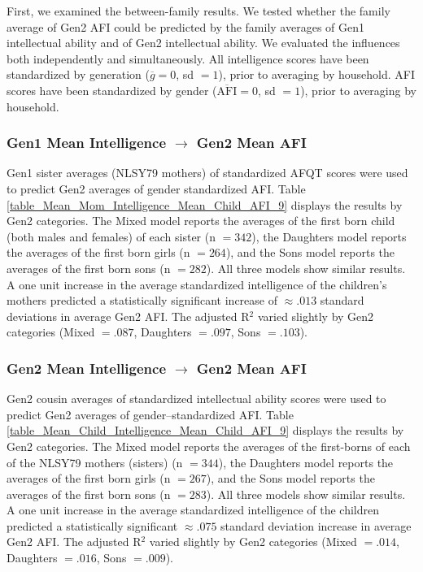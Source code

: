 First, we examined the between-family results. We tested whether the family average of Gen2 AFI could be predicted by the family averages of Gen1 intellectual ability and of Gen2 intellectual ability. We evaluated the influences both independently and simultaneously. All intelligence scores have been standardized by generation ($\overline{g} = 0$, sd $= 1$), prior to averaging by household. AFI scores have been standardized by gender ($\overline{\mathrm{AFI}} = 0$, sd $= 1$), prior to averaging by household.

\subsubsection{Gen1 Mean Intelligence $\rightarrow$ Gen2 Mean AFI} Gen1 sister averages (NLSY79 mothers) of standardized AFQT scores were used to predict Gen2 averages of gender standardized AFI. Table \ref{table_Mean_Mom_Intelligence_Mean_Child_AFI_9} displays the results by Gen2 categories. The Mixed model reports the averages of the first born child (both males and females) of each sister (n $= 342$), the Daughters model reports the averages of the first born girls (n $= 264$), and the Sons model reports the averages of the first born sons (n $= 282$). All three models show similar results. A one unit increase in the average standardized intelligence of the children's mothers predicted a statistically significant increase of $\approx .013$ standard deviations in average Gen2 AFI. The adjusted R$^{2}$ varied slightly by Gen2 categories (Mixed $= .087$, Daughters $= .097$, Sons $= .103$).

\subsubsection{Gen2 Mean Intelligence $\rightarrow$ Gen2 Mean AFI} Gen2 cousin averages of standardized intellectual ability scores were used to predict Gen2 averages of gender--standardized AFI. Table \ref{table_Mean_Child_Intelligence_Mean_Child_AFI_9} displays the results by Gen2 categories. The Mixed model reports the averages of the first-borns of each of the NLSY79 mothers (sisters) (n $= 344$), the Daughters model reports the averages of the first born girls (n $= 267$), and the Sons model reports the averages of the first born sons (n $= 283$). All three models show similar results. A one unit increase in the average standardized intelligence of the children predicted a statistically significant $\approx .075$ standard deviation increase in average Gen2 AFI. The adjusted R$^{2}$ varied slightly by Gen2 categories (Mixed $= .014$, Daughters $= .016$, Sons $= .009$).

